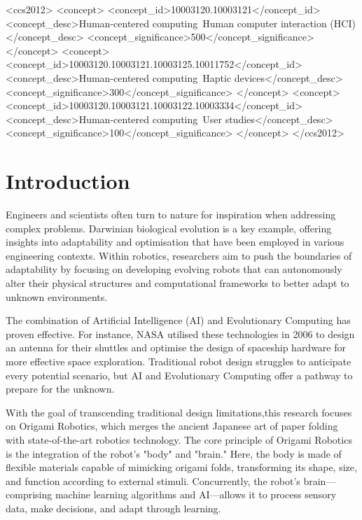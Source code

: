 \documentclass{sigchi}
\def\plainkeywords{Origami Robotics; Evolutionary Computing}
\begin{document}

\begin{CCSXML}
<ccs2012>
<concept>
<concept_id>10003120.10003121</concept_id>
<concept_desc>Human-centered computing~Human computer interaction (HCI)</concept_desc>
<concept_significance>500</concept_significance>
</concept>
<concept>
<concept_id>10003120.10003121.10003125.10011752</concept_id>
<concept_desc>Human-centered computing~Haptic devices</concept_desc>
<concept_significance>300</concept_significance>
</concept>
<concept>
<concept_id>10003120.10003121.10003122.10003334</concept_id>
<concept_desc>Human-centered computing~User studies</concept_desc>
<concept_significance>100</concept_significance>
</concept>
</ccs2012>
\end{CCSXML}


\keywords{\plainkeywords}


\section{Introduction}
Engineers and scientists often turn to nature for inspiration when addressing complex problems. Darwinian biological evolution is a key example, offering insights into adaptability and optimisation that have been employed in various engineering contexts. Within robotics, researchers aim to push the boundaries of adaptability by focusing on developing evolving robots that can autonomously alter their physical structures and computational frameworks to better adapt to unknown environments.

The combination of Artificial Intelligence (AI) and Evolutionary Computing has proven effective. For instance, NASA utilised these technologies in 2006 to design an antenna for their shuttles\cite{lohn2008human} and optimise the design of spaceship hardware for more effective space exploration\cite{noauthor_nasa_2023}. Traditional robot design struggles to anticipate every potential scenario, but AI and Evolutionary Computing offer a pathway to prepare for the unknown.

With the goal of transcending traditional design limitations,this research focuses on Origami Robotics, which merges the ancient Japanese art of paper folding with state-of-the-art robotics technology. The core principle of Origami Robotics is the integration of the robot's "body" and "brain." Here, the body is made of flexible materials capable of mimicking origami folds, transforming its shape, size, and function according to external stimuli. Concurrently, the robot's brain—comprising machine learning algorithms and AI—allows it to process sensory data, make decisions, and adapt through learning.
\end{document}

